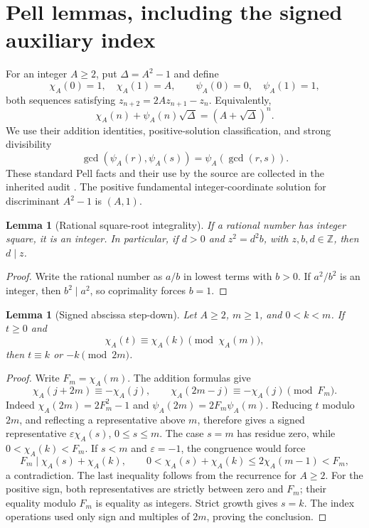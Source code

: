 \documentclass[11pt,a4paper]{article}
\newtheorem{lemma}[theorem]{Lemma}
\theoremstyle{definition}
\theoremstyle{remark}
\newcommand{\Z}{\mathbb Z}
\begin{document}
\section{Pell lemmas, including the signed auxiliary index}
\label{sec:pell}

For an integer \(A\ge2\), put \(\Delta=A^2-1\) and define
\[
 \chi_A(0)=1,\quad \chi_A(1)=A,\qquad
 \psi_A(0)=0,\quad \psi_A(1)=1,
\]
both sequences satisfying \(z_{n+2}=2Az_{n+1}-z_n\).
Equivalently,
\[
 \chi_A(n)+\psi_A(n)\sqrt{\Delta}
       =(A+\sqrt{\Delta})^n.
\]
We use their addition identities, positive-solution classification, and
strong divisibility
\[
 \gcd(\psi_A(r),\psi_A(s))=\psi_A(\gcd(r,s)).
\]
These standard Pell facts and their use by the source are collected in
the inherited audit \cite{pellaudit}. The positive fundamental
integer-coordinate solution for discriminant \(A^2-1\) is \((A,1)\).

\begin{lemma}[Rational square-root integrality]
\label{lem:rational}
If a rational number has integer square, it is an integer. In particular,
if \(d>0\) and \(z^2=d^2b\), with \(z,b,d\in\Z\), then \(d\mid z\).
\end{lemma}
\begin{proof}
Write the rational number as \(a/b\) in lowest terms with \(b>0\).
If \(a^2/b^2\) is an integer, then \(b^2\mid a^2\), so coprimality
forces \(b=1\).
\end{proof}

\begin{lemma}[Signed abscissa step-down]
\label{lem:stepdown}
Let \(A\ge2\), \(m\ge1\), and \(0<k<m\). If \(t\ge0\) and
\[
 \chi_A(t)\equiv\chi_A(k)\pmod{\chi_A(m)},
\]
then \(t\equiv k\) or \(-k\pmod{2m}\).
\end{lemma}
\begin{proof}
Write \(F_m=\chi_A(m)\). The addition formulas give
\[
 \chi_A(j+2m)\equiv-\chi_A(j),\qquad
 \chi_A(2m-j)\equiv-\chi_A(j)\pmod{F_m}.
\]
Indeed \(\chi_A(2m)=2F_m^2-1\) and
\(\psi_A(2m)=2F_m\psi_A(m)\). Reducing \(t\) modulo \(2m\), and
reflecting a representative above \(m\), therefore gives a signed
representative \(\varepsilon\chi_A(s)\), \(0\le s\le m\).
The case \(s=m\) has residue zero, while
\(0<\chi_A(k)<F_m\). If \(s<m\) and \(\varepsilon=-1\), the
congruence would force
\[
 F_m\mid\chi_A(s)+\chi_A(k),\qquad
 0<\chi_A(s)+\chi_A(k)\le2\chi_A(m-1)<F_m,
\]
a contradiction. The last inequality follows from the recurrence for
\(A\ge2\). For the positive sign, both representatives are strictly
between zero and \(F_m\); their equality modulo \(F_m\) is equality as
integers. Strict growth gives \(s=k\). The index operations used only
sign and multiples of \(2m\), proving the conclusion.
\end{proof}
\end{document}
